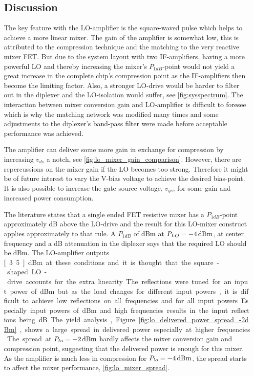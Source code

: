 	\subsection{Discussion}
		The key feature with the LO-amplifier is the square-waved pulse which helps to achieve a more linear mixer. The gain of the amplifier is somewhat low, this is attributed to the compression technique and the matching to the very reactive mixer FET. But due to the system layout with two IF-amplifiers, having a more powerful LO and thereby increasing the mixer's $P_{1dB}$-point would not yield a great increase in the complete chip's compression point as the IF-amplifiers then become the limiting factor. Also, a stronger LO-drive would be harder to filter out in the diplexer and the LO-isolation would suffer, see \autoref{fig:sysspectrum}. The interaction between mixer conversion gain and LO-amplifier is difficult to foresee which is why the matching network was modified many times and some adjustments to the diplexer's band-pass filter were made before acceptable performance was achieved.

		The amplifier can deliver some more gain in exchange for compression by increasing $v_{ds}$ a notch, see \autoref{fig:lo_mixer_gain_comparison}. However, there are repercussions on the mixer gain if the LO becomes too strong. Therefore it might be of future interest to vary the \unit[5]{V}-bias voltage to achieve the desired bias-point. It is also possible to increase the gate-source voltage, $v_{gs}$, for some gain and increased power consumption.

		The literature states that a single ended FET resistive mixer has a $P_{1dB}$-point approximately \unit[4]{dB} above the LO-drive\autocite{radmanesh2002state} and the result for this LO-mixer construct applies approximately to that rule. A $P_{1dB}$ of \unit[12]{dBm} at $P_{LO}=\unit[-4]{dBm}$, at center frequency and a \unit[3]{dB} attenuation in the diplexer says that the required LO should be \unit[5]{dBm}. The LO-amplifier outputs \unit[3.5]{dBm} at these conditions and it is thought that the square-shaped LO-drive accounts for the extra linearity.

		The reflections were tuned for an input power of \unit[-2]{dBm} but as the load changes for different input powers, it is difficult to achieve low reflections on all frequencies and for all input powers. Especially input powers of \unit[-4]{dBm} and high frequencies results in the input reflections being \unit[-10]{dB}.

		The yield analysis, Figure \autoref{fig:lo_delivered_power_spread_-2dBm}, shows a large spread in delivered power especially at higher frequencies.  The spread at $P_{lo}=\unit[-2]{dBm}$ hardly affects the mixer conversion gain and compression point, suggesting that the delivered power is enough for this mixer. As the amplifier is much less in compression for $P_{lo}=\unit[-4]{dBm}$, the spread starts to affect the mixer performance, \autoref{fig:lo_mixer_spread}.

